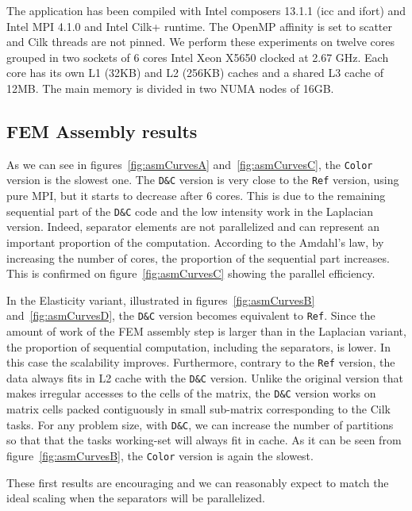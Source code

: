 \documentclass[10pt]{IOS-Book-Article}
\begin{document}
The application has been compiled with Intel composers 13.1.1 (icc and ifort) and Intel MPI 4.1.0 and Intel Cilk+ runtime. The OpenMP affinity is set to scatter and Cilk threads are not pinned.
We perform these experiments on twelve cores grouped in two sockets of 6 cores Intel Xeon X5650 clocked at 2.67 GHz.
Each core has its own L1 (32KB) and L2 (256KB) caches and a shared L3 cache of 12MB. The main memory is divided in two NUMA nodes of 16GB.

\subsection{FEM Assembly results}
As we can see in figures~\ref{fig:asmCurvesA} and~\ref{fig:asmCurvesC}, the {\tt Color} version is the slowest one.
The {\tt D\&C} version is very close to the {\tt Ref} version, using pure MPI, but it starts to decrease after 6 cores. 
This is due to the remaining sequential part of the {\tt D\&C} code and the low intensity work in the Laplacian version.
Indeed, separator elements are not parallelized and can represent an important proportion of the computation.
According to the Amdahl's law, by increasing the number of cores, the proportion of the sequential part increases.
This is confirmed on figure~\ref{fig:asmCurvesC} showing the parallel efficiency.

In the Elasticity variant, illustrated in figures~\ref{fig:asmCurvesB} and~\ref{fig:asmCurvesD}, the {\tt D\&C} version becomes equivalent to {\tt Ref}.
Since the amount of work of the FEM assembly step is larger than in the Laplacian variant, the proportion of sequential computation, including the separators, is lower.
In this case the scalability improves. Furthermore, contrary to the {\tt Ref} version, the data always fits in L2 cache with the {\tt D\&C} version.
Unlike the original version that makes irregular accesses to the cells of the matrix, the {\tt D\&C} version works on matrix cells packed contiguously in small sub-matrix corresponding to the Cilk tasks.
For any problem size, with {\tt D\&C}, we can increase the number of partitions so that that the tasks working-set will always fit in cache.
As it can be seen from figure~\ref{fig:asmCurvesB}, the {\tt Color} version is again the slowest.

These first results are encouraging and we can reasonably expect to match the ideal scaling when the separators will be parallelized.
\end{document}

